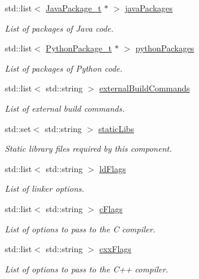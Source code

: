 \begin{DoxyCompactItemize}
std\+::list$<$ \hyperlink{structmodel_1_1_java_package__t}{Java\+Package\+\_\+t} $\ast$ $>$ \hyperlink{structmodel_1_1_component__t_a929279910b7134664af23c7e8248aeda}{java\+Packages}
\begin{DoxyCompactList}\small\item\em List of packages of Java code. \end{DoxyCompactList}\item 
std\+::list$<$ \hyperlink{structmodel_1_1_python_package__t}{Python\+Package\+\_\+t} $\ast$ $>$ \hyperlink{structmodel_1_1_component__t_a826d9dfd0bd18fb0e016db82d3314b2a}{python\+Packages}
\begin{DoxyCompactList}\small\item\em List of packages of Python code. \end{DoxyCompactList}\item 
std\+::list$<$ std\+::string $>$ \hyperlink{structmodel_1_1_component__t_a8024a14c66ae3392e4f702823bc264f3}{external\+Build\+Commands}
\begin{DoxyCompactList}\small\item\em List of external build commands. \end{DoxyCompactList}\item 
std\+::set$<$ std\+::string $>$ \hyperlink{structmodel_1_1_component__t_a42409c3935816241afba525c0cd3518f}{static\+Libs}
\begin{DoxyCompactList}\small\item\em Static library files required by this component. \end{DoxyCompactList}\item 
std\+::list$<$ std\+::string $>$ \hyperlink{structmodel_1_1_component__t_ab5721bf032cc10f21770ce555f27aa44}{ld\+Flags}
\begin{DoxyCompactList}\small\item\em List of linker options. \end{DoxyCompactList}\item 
std\+::list$<$ std\+::string $>$ \hyperlink{structmodel_1_1_component__t_a72dfa15e3934bc3dd19b039f1aeb48e1}{c\+Flags}
\begin{DoxyCompactList}\small\item\em List of options to pass to the C compiler. \end{DoxyCompactList}\item 
std\+::list$<$ std\+::string $>$ \hyperlink{structmodel_1_1_component__t_a9f652c0f3ce9c96529d6949e82ee8641}{cxx\+Flags}
\begin{DoxyCompactList}\small\item\em List of options to pass to the C++ compiler. \end{DoxyCompactList}\item 

\end{DoxyCompactItemize}
